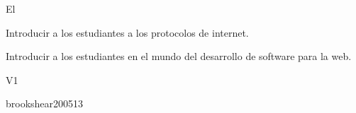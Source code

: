 \begin{syllabus}


\begin{justification}
El 
\end{justification}

\begin{goals}
\item Introducir a los estudiantes a los protocolos de internet.
\item Introducir a los estudiantes en el mundo del desarrollo de software para la web.
\end{goals}

\begin{outcomes}{V1}
   \item {}
   \item {}
   \item {}
   \item {}
   \item {}
\end{outcomes}

\begin{unit}{\NCIntroduction}{}{brookshear2005}{1}{3}
   \NCIntroductionAllTopics
   \NCIntroductionAllLearningOutcomes
\end{unit}



\begin{coursebibliography}
\end{coursebibliography}

\end{syllabus}

%

